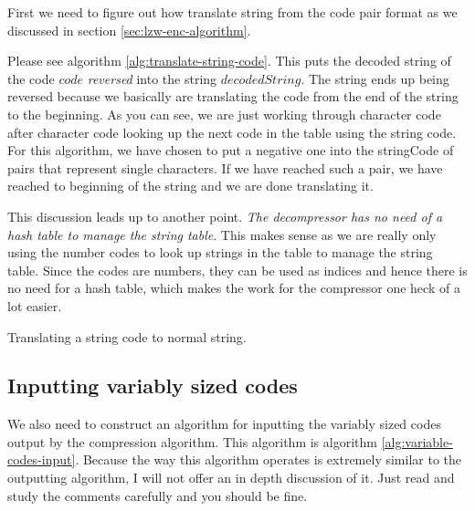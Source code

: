 \begin{refsection}
First we need to figure out how translate string from the code pair format as we
discussed in section \ref{sec:lzw-enc-algorithm}.

Please see algorithm \ref{alg:translate-string-code}. This puts the
decoded string of the code $code$ \textit{reversed} into the string
$decodedString$. The string ends up being reversed because we
basically are translating the code from the end of the string to the
beginning. As you can see, we are just working through character code
after character code looking up the next code in the table using the
string code. For this algorithm, we have chosen to put a negative one
into the stringCode of pairs that represent single characters. If we
have reached such a pair, we have reached to beginning of the string
and we are done translating it.

This discussion leads up to another point. \textit{The decompressor
  has no need of a hash table to manage the string table}. This makes sense as
we are really only using the number codes to look up strings in the
table to manage the string table. Since the codes are numbers, they
can be used as indices and hence there is no need for a hash table,
which makes the work for the compressor one heck of a lot easier.

\begin{algorithm}[H]
  \caption{Translating a string code to normal string.}
  \label{alg:translate-string-code}
  \begin{algorithmic}[1]
    \While{\True}

        \Break
      \Else
      \EndIf
    \EndWhile
  \end{algorithmic}
\end{algorithm}

\subsection{Inputting variably sized codes}

We also need to construct an algorithm for inputting the variably
sized codes output by the compression algorithm. This algorithm is
algorithm \ref{alg:variable-codes-input}. Because the way this algorithm operates is extremely
similar to the outputting algorithm, I will not offer an in depth
discussion of it. Just read and study the comments carefully and you
should be fine.


\end{refsection}
